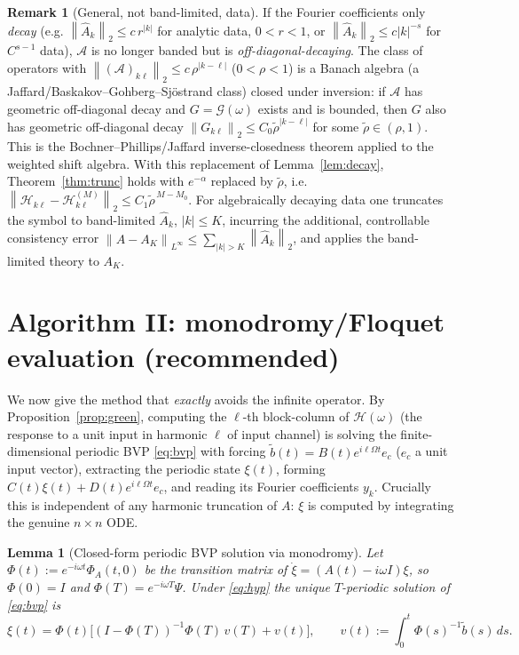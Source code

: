 \documentclass{amsart}
\newtheorem{lemma}{Lemma}
\theoremstyle{definition}
\newtheorem{remark}{Remark}
\newcommand{\norm}[1]{\left\lVert#1\right\rVert}
\newcommand{\Acal}{\mathcal{A}}
\newcommand{\Hcal}{\mathcal{H}}
\begin{document}
\begin{remark}[General, not band-limited, data]\label{rem:general}
If the Fourier coefficients only \emph{decay} (e.g. $\norm{\hat A_k}_2\le c\,r^{|k|}$
for analytic data, $0<r<1$, or $\norm{\hat A_k}_2\le c|k|^{-s}$ for $C^{s-1}$ data),
$\Acal$ is no longer banded but is \emph{off-diagonal-decaying}. The class of
operators with $\norm{(\Acal)_{k\ell}}_2\le c\,\rho^{|k-\ell|}$ ($0<\rho<1$) is a
Banach algebra (a Jaffard/Baskakov–Gohberg–Sjöstrand class) closed under
inversion: if $\Acal$ has geometric off-diagonal decay and $G=\mathcal G(\omega)$
exists and is bounded, then $G$ also has geometric off-diagonal decay
$\norm{G_{k\ell}}_2\le C_0\tilde\rho^{|k-\ell|}$ for some $\tilde\rho\in(\rho,1)$.
This is the Bochner–Phillips/Jaffard inverse-closedness theorem applied to the
weighted shift algebra. With this replacement of Lemma~\ref{lem:decay},
Theorem~\ref{thm:trunc} holds with $e^{-\alpha}$ replaced by $\tilde\rho$, i.e.
$\norm{\Hcal_{k\ell}-\Hcal^{(M)}_{k\ell}}_2\le C_1\tilde\rho^{\,M-M_0}$. For
algebraically decaying data one truncates the symbol to band-limited
$\hat A_k$, $|k|\le K$, incurring the additional, controllable consistency error
$\norm{A-A_K}_{L^\infty}\le\sum_{|k|>K}\norm{\hat A_k}_2$, and applies the
band-limited theory to $A_K$.
\end{remark}

\section{Algorithm II: monodromy/Floquet evaluation (recommended)}
\label{sec:mono}

We now give the method that \emph{exactly} avoids the infinite operator. By
Proposition~\ref{prop:green}, computing the $\ell$-th block-column of
$\Hcal(\omega)$ (the response to a unit input in harmonic $\ell$ of input
channel) is solving the finite-dimensional periodic BVP \eqref{eq:bvp} with
forcing $\tilde b(t)=B(t)e^{i\ell\Omega t}e_c$ ($e_c$ a unit input vector),
extracting the periodic state $\xi(t)$, forming $C(t)\xi(t)+D(t)e^{i\ell\Omega t}e_c$,
and reading its Fourier coefficients $y_k$. Crucially this is independent of any
harmonic truncation of $A$: $\xi$ is computed by integrating the genuine
$n\times n$ ODE.

\begin{lemma}[Closed-form periodic BVP solution via monodromy]\label{lem:monoform}
Let $\Phi(t):=e^{-i\omega t}\Phi_A(t,0)$ be the transition matrix of
$\dot\xi=(A(t)-i\omega I)\xi$, so $\Phi(0)=I$ and $\Phi(T)=e^{-i\omega T}\Psi$.
Under \eqref{eq:hyp} the unique $T$-periodic solution of \eqref{eq:bvp} is
\begin{equation}\label{eq:xiform}
\xi(t)=\Phi(t)\Big[(I-\Phi(T))^{-1}\Phi(T)\,v(T)+v(t)\Big],\qquad
v(t):=\int_0^t\Phi(s)^{-1}\tilde b(s)\,ds .
\end{equation}
\end{lemma}
\end{document}
